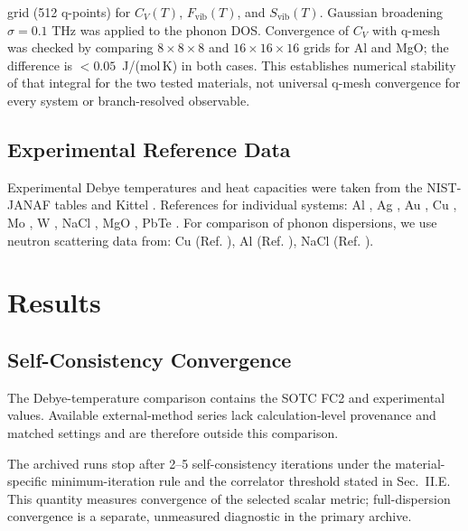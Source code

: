 \documentclass[aps,prb,reprint,amsmath,amssymb,floatfix]{revtex4-2}
\begin{document}
\color{revisionblue}
grid (512 q-points) for \(C_V(T)\), \(F_\text{vib}(T)\), and
\(S_\text{vib}(T)\). Gaussian broadening \(\sigma = 0.1\) THz was
applied to the phonon DOS. Convergence of \(C_V\) with q-mesh was checked by
comparing \(8\times8\times8\) and \(16\times16\times16\) grids for Al and MgO;
the difference is \(<0.05\)~J/(mol\,K) in both cases. This establishes numerical
stability of that integral for the two tested materials, not universal q-mesh
convergence for every system or branch-resolved observable.
\color{black}

\subsection{Experimental Reference
Data}\label{experimental-reference-data}

\color{revisionblue}
Experimental Debye temperatures and heat capacities were taken from the
NIST-JANAF tables \cite{ref20} and Kittel \cite{ref21}. References for
individual systems: Al \cite{ref22}, Ag \cite{ref25}, Au
\cite{ref23}, Cu \cite{ref24,ref33}, Mo \cite{ref26}, W \cite{ref27},
NaCl \cite{ref28}, MgO \cite{ref29,ref30}, PbTe \cite{ref31,ref32}. For
comparison of phonon dispersions, we use neutron scattering data from:
Cu (Ref. \cite{ref33}), Al (Ref. \cite{ref34}), NaCl (Ref.
\cite{ref35}).
\color{black}

\section{Results}\label{results}

\subsection{Self-Consistency
Convergence}\label{self-consistency-convergence}

\color{revisionblue}
The Debye-temperature comparison contains the SOTC FC2 and experimental values.
Available external-method series lack calculation-level provenance and matched
settings and are therefore outside this comparison.
\color{black}

\color{revisionblue}
The archived runs stop after 2--5 self-consistency iterations under the
material-specific minimum-iteration rule and the correlator threshold stated in
Sec.~II.E. This quantity measures convergence of the selected scalar metric;
full-dispersion convergence is a separate, unmeasured diagnostic in the primary
archive.
\color{black}
\end{document}
